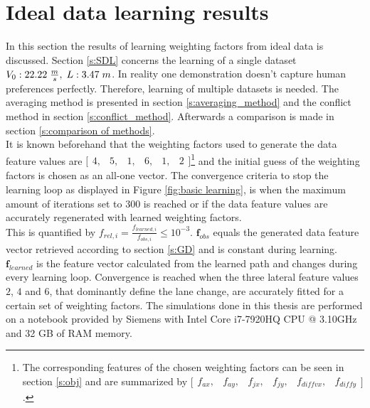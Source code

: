 \section{Ideal data learning results} \label{s:ID_results}
In this section the results of learning weighting factors from ideal data is discussed.
Section \ref{s:SDL} concerns the learning of a single dataset $V_0:22.22\hspace{1mm}\frac{m}{s},\hspace{1mm} L:3.47\hspace{1mm}m$. In reality one  demonstration doesn't capture human preferences perfectly. Therefore, learning of multiple datasets is needed. The averaging method is presented in section \ref{s:averaging_method} and the conflict method in section \ref{s:conflict_method}. Afterwards a comparison is made in section \ref{s:comparison of methods}.\\

It is known beforehand that the weighting factors used to generate the data feature values are  $\bigl[ \begin{smallmatrix} 4,&5,&1,&6,&1,&2\end{smallmatrix}\bigr]$\footnote{The corresponding features  of the chosen weighting factors can be seen in section \ref{s:obj} and are summarized by $\bigl[ \begin{smallmatrix} f_{ax},&f_{ay},&f_{jx},&f_{jy},&f_{diff vx},&f_{diff y}\end{smallmatrix}\bigr]$.} and the initial guess of the weighting factors is chosen as an all-one vector. The convergence criteria to stop the learning loop as displayed in Figure \ref{fig:basic learning}, is when the maximum amount of iterations set to $300$ is reached or if the data feature values are accurately regenerated with learned weighting factors.\\
This is quantified by $f_{rel,i} = \frac{f_{learned,i}}{f_{obs,i}} \leq 10^{-3}$.  $\bm{f}_{obs}$ equals the generated data feature vector retrieved according to section \ref{s:GD} and is constant during learning. $\bm{f}_{learned}$ is the feature vector calculated from the learned path and changes during every learning loop. Convergence is reached when the three lateral feature values $2$, $4$ and $6$, that dominantly define the lane change, are accurately fitted for a certain set of weighting factors. The simulations done in this thesis are performed on a notebook provided by Siemens with Intel Core i7-7920HQ CPU @ 3.10GHz and 32 GB of RAM memory.
		
